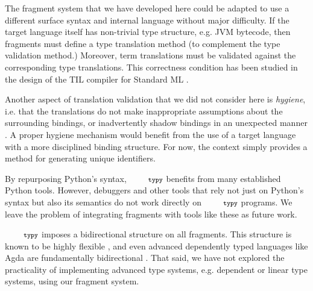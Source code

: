 \documentclass[10pt]{sigplanconf}
\newcommand{\typy}{\texttt{\footnotesize typy}}
\begin{document}
The fragment system that we have developed here could be adapted to use a different surface syntax and internal language without major difficulty. If the target language itself has non-trivial type structure, e.g. JVM bytecode, then fragments must define a type translation method (to complement the type validation method.) Moreover, term translations must be validated against the corresponding type translations. This correctness condition has been studied in the design of the TIL compiler for Standard ML \cite{tarditi+:til-OLD}. %

Another aspect of translation validation that we did not consider here is \emph{hygiene}, i.e. that the translations do not make inappropriate assumptions about the surrounding bindings, or inadvertently shadow bindings in an unexpected manner \cite{Kohlbecker86a,DBLP:conf/popl/Adams15}. A proper hygiene mechanism would benefit from the use of a target language with a more disciplined binding structure. For now, the context simply provides a method for generating unique identifiers.

By repurposing Python's syntax, $\typy$ benefits from many established Python tools. However, debuggers and other tools that rely not just on Python's syntax but also its semantics do not work directly on $\typy$ programs. We leave the problem of integrating fragments with tools like these as future work. %


$\typy$ imposes a bidirectional structure on all fragments. This structure is known to be highly flexible \cite{conf/icfp/DunfieldK13}, and even advanced dependently typed languages like Agda are fundamentally bidirectional \cite{norell2007towards}. That said, we have not explored the practicality of implementing advanced type systems, e.g. dependent or linear type systems, using our fragment system.  %
\end{document}
